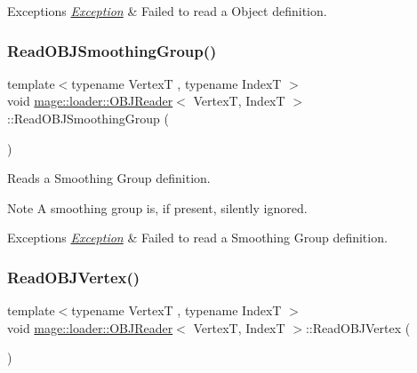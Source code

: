\begin{DoxyExceptions}{Exceptions}
{\em \hyperlink{classmage_1_1_exception}{Exception}} & Failed to read a Object definition. \\
\hline
\end{DoxyExceptions}
\hypertarget{classmage_1_1loader_1_1_o_b_j_reader_a55f0cc67dc459f188aaa192c8e2c99d0}{}\label{classmage_1_1loader_1_1_o_b_j_reader_a55f0cc67dc459f188aaa192c8e2c99d0} 
\subsubsection{\texorpdfstring{Read\+O\+B\+J\+Smoothing\+Group()}{ReadOBJSmoothingGroup()}}
{\footnotesize\ttfamily template$<$typename VertexT , typename IndexT $>$ \\
void \hyperlink{classmage_1_1loader_1_1_o_b_j_reader}{mage\+::loader\+::\+O\+B\+J\+Reader}$<$ VertexT, IndexT $>$\+::Read\+O\+B\+J\+Smoothing\+Group (\begin{DoxyParamCaption}{ }\end{DoxyParamCaption})\hspace{0.3cm}{\ttfamily [private]}}

Reads a Smoothing Group definition.

\begin{DoxyNote}{Note}
A smoothing group is, if present, silently ignored. 
\end{DoxyNote}

\begin{DoxyExceptions}{Exceptions}
{\em \hyperlink{classmage_1_1_exception}{Exception}} & Failed to read a Smoothing Group definition. \\
\hline
\end{DoxyExceptions}
\hypertarget{classmage_1_1loader_1_1_o_b_j_reader_a27f85f1786398a540fefa34055683e92}{}\label{classmage_1_1loader_1_1_o_b_j_reader_a27f85f1786398a540fefa34055683e92} 
\subsubsection{\texorpdfstring{Read\+O\+B\+J\+Vertex()}{ReadOBJVertex()}}
{\footnotesize\ttfamily template$<$typename VertexT , typename IndexT $>$ \\
void \hyperlink{classmage_1_1loader_1_1_o_b_j_reader}{mage\+::loader\+::\+O\+B\+J\+Reader}$<$ VertexT, IndexT $>$\+::Read\+O\+B\+J\+Vertex (\begin{DoxyParamCaption}{ }\end{DoxyParamCaption})\hspace{0.3cm}{\ttfamily [private]}}

